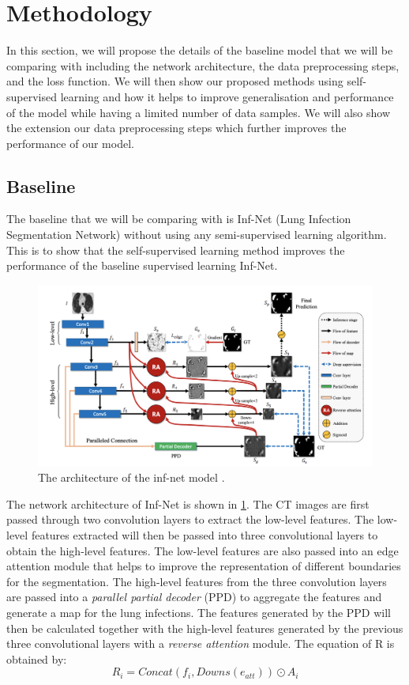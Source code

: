 \section{Methodology}


In this section, we will propose the details of the baseline model that we will be comparing with including the network architecture, the data preprocessing steps, and the loss function. We will then show our proposed methods using self-supervised learning and how it helps to improve generalisation and performance of the model while having a limited number of data samples. We will also show the extension our data preprocessing steps which further improves the performance of our model.

\subsection{Baseline}
The baseline that we will be comparing with is Inf-Net (Lung Infection Segmentation Network) \cite{ref14} without using any semi-supervised learning algorithm. This is to show that the self-supervised learning method  improves the performance of the baseline supervised learning Inf-Net. 

\begin{figure}
	\centering
	\includegraphics[width=\linewidth]{inf-net_architecture.png}
	\caption{The architecture of the inf-net model \cite{ref14}.}
	\label{fig:inf-net_arch}
\end{figure}

The network architecture of Inf-Net is shown in \ref{fig:inf-net_arch}. The CT images are first passed through two convolution layers to extract the low-level features. The low-level features extracted will then be passed into three convolutional layers to obtain the high-level features. The low-level features are also passed into an edge attention module that helps to improve the representation of different boundaries for the segmentation. The high-level features from the three convolution layers are passed into a \textit{parallel partial decoder} (PPD) to aggregate the features and generate a map for the lung infections. The features generated by the PPD will then be calculated together with the high-level features generated by the previous three convolutional layers with a \textit{reverse attention } module. The equation of R is obtained by:
\begin{equation}
R_i = Concat(f_i, Downs(e_{att}))\odot A_i
\end{equation}

